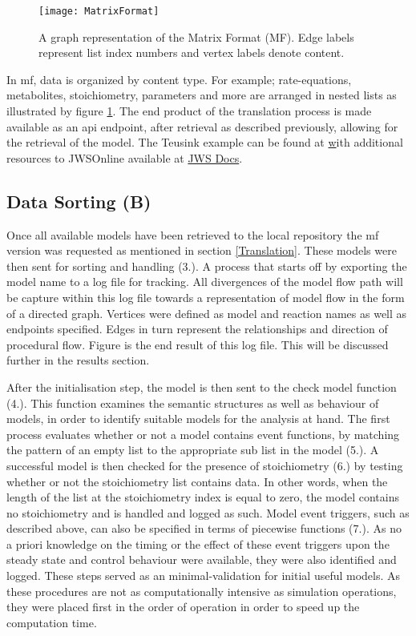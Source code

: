 \begin{figure}[p]
\texttt{[image: MatrixFormat]}
\centering
\caption{A graph representation of the Matrix Format (MF). Edge labels represent list index numbers and vertex labels denote content.}
\label{fig:MatrixFormat}
\end{figure}

In \gls{mf}, data is organized by content type. For example; rate-equations, metabolites, stoichiometry, parameters and more are arranged in nested lists as illustrated by figure \ref{fig:MatrixFormat}. The end product of the translation process is made available as an \gls{api} endpoint, after retrieval as described previously, allowing for the retrieval of the model. The Teusink example can be found at \href{https://jjj.bio.vu.nl/rest/models/teusink/mf/} with additional resources to JWSOnline available at \href{http://jws-docs.readthedocs.io/8_rest.html}{JWS Docs}.

\subsection{Data Sorting (B)}
Once all available models have been retrieved to the local repository the mf version was requested as mentioned in section \ref{Translation}. These models were then sent for sorting and handling (3.). A process that starts off by exporting the model name to a log file for tracking. All divergences of the model flow path will be capture within this log file towards a representation of model flow in the form of a directed graph. Vertices were defined as model and reaction names as well as endpoints specified. Edges in turn represent the relationships and direction of procedural flow. Figure is the end result of this log file. This will be discussed further in the results section. 

After the initialisation step, the model is then sent to the check model function (4.). This function examines the semantic structures as well as behaviour of models, in order to identify suitable models for the analysis at hand. The first process evaluates whether or not a model contains event functions, by matching the pattern of an empty list to the appropriate sub list in the model (5.). A successful model is then checked for the presence of stoichiometry (6.) by testing whether or not the stoichiometry list contains data. In other words, when the length of the list at the stoichiometry index is equal to zero, the model contains no stoichiometry and is handled and logged as such. Model event triggers, such as described above, can also be specified in terms of piecewise functions (7.). As no a priori knowledge on the timing or the effect of these event triggers upon the steady state and control behaviour were available, they were also identified and logged. These steps served as an minimal-validation for initial useful models. As these procedures are not as computationally intensive as simulation operations, they were placed first in the order of operation in order to speed up the computation time. 

